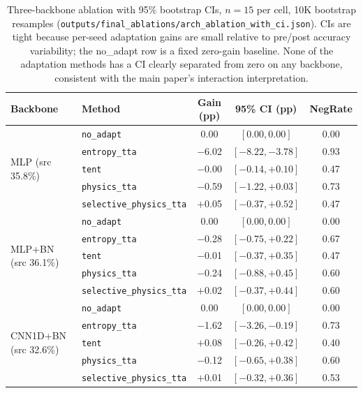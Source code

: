 \begin{table}[h]
\centering
\caption{Three-backbone ablation with 95\% bootstrap CIs, $n{=}15$ per cell, 10K bootstrap resamples (\texttt{outputs/final\_ablations/arch\_ablation\_with\_ci.json}). CIs are tight because per-seed adaptation gains are small relative to pre/post accuracy variability; the no\_adapt row is a fixed zero-gain baseline. None of the adaptation methods has a CI clearly separated from zero on any backbone, consistent with the main paper's interaction interpretation.}
\label{tab:arch_bootstrap_ci}
\small
\setlength{\tabcolsep}{4pt}
\begin{tabular}{llccc}
\toprule
\textbf{Backbone} & \textbf{Method} & \textbf{Gain (pp)} & \textbf{95\% CI (pp)} & \textbf{NegRate} \\
\midrule
\multirow{5}{*}{MLP (src 35.8\%)} & \texttt{no\_adapt}          & 0.00  & $[0.00, 0.00]$    & 0.00 \\
 & \texttt{entropy\_tta}                                         & $-$6.02 & $[-8.22, -3.78]$ & 0.93 \\
 & \texttt{tent}                                                & $-$0.00 & $[-0.14, +0.10]$ & 0.47 \\
 & \texttt{physics\_tta}                                        & $-$0.59 & $[-1.22, +0.03]$ & 0.73 \\
 & \texttt{selective\_physics\_tta}                             & $+$0.05 & $[-0.37, +0.52]$ & 0.47 \\
\midrule
\multirow{5}{*}{MLP+BN (src 36.1\%)} & \texttt{no\_adapt}       & 0.00  & $[0.00, 0.00]$   & 0.00 \\
 & \texttt{entropy\_tta}                                        & $-$0.28 & $[-0.75, +0.22]$ & 0.67 \\
 & \texttt{tent}                                                & $-$0.01 & $[-0.37, +0.35]$ & 0.47 \\
 & \texttt{physics\_tta}                                        & $-$0.24 & $[-0.88, +0.45]$ & 0.60 \\
 & \texttt{selective\_physics\_tta}                             & $+$0.02 & $[-0.37, +0.44]$ & 0.60 \\
\midrule
\multirow{5}{*}{CNN1D+BN (src 32.6\%)} & \texttt{no\_adapt}     & 0.00  & $[0.00, 0.00]$   & 0.00 \\
 & \texttt{entropy\_tta}                                        & $-$1.62 & $[-3.26, -0.19]$ & 0.73 \\
 & \texttt{tent}                                                & $+$0.08 & $[-0.26, +0.42]$ & 0.40 \\
 & \texttt{physics\_tta}                                        & $-$0.12 & $[-0.65, +0.38]$ & 0.60 \\
 & \texttt{selective\_physics\_tta}                             & $+$0.01 & $[-0.32, +0.36]$ & 0.53 \\
\bottomrule
\end{tabular}
\end{table}

